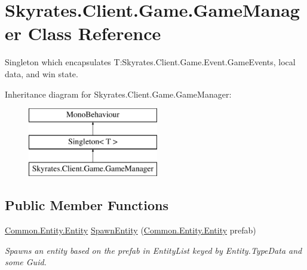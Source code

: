 \hypertarget{class_skyrates_1_1_client_1_1_game_1_1_game_manager}{\section{Skyrates.\-Client.\-Game.\-Game\-Manager Class Reference}
\label{class_skyrates_1_1_client_1_1_game_1_1_game_manager}
}


Singleton which encapsulates T\-:\-Skyrates.\-Client.\-Game.\-Event.\-Game\-Events, local data, and win state.  


Inheritance diagram for Skyrates.\-Client.\-Game.\-Game\-Manager\-:\begin{figure}[H]
\begin{center}
\leavevmode
\includegraphics[height=3.000000cm]{class_skyrates_1_1_client_1_1_game_1_1_game_manager}
\end{center}
\end{figure}
\subsection*{Public Member Functions}
\begin{DoxyCompactItemize}
\item 
\hyperlink{class_skyrates_1_1_common_1_1_entity_1_1_entity}{Common.\-Entity.\-Entity} \hyperlink{class_skyrates_1_1_client_1_1_game_1_1_game_manager_ad1b61843cedea4f8a79d0d3d4801a4a6}{Spawn\-Entity} (\hyperlink{class_skyrates_1_1_common_1_1_entity_1_1_entity}{Common.\-Entity.\-Entity} prefab)
\begin{DoxyCompactList}\small\item\em Spawns an entity based on the prefab in Entity\-List keyed by Entity.\-Type\-Data and some Guid. \end{DoxyCompactList}\end{DoxyCompactItemize}
